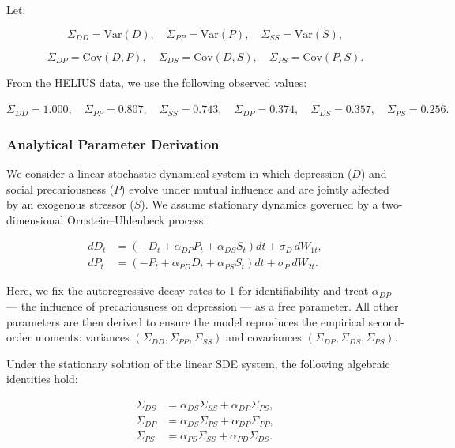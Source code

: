 \documentclass[
]{article}
\begin{document}
Let:

\[
\Sigma_{DD} = \mathrm{Var}(D), \quad \Sigma_{PP} = \mathrm{Var}(P), \quad \Sigma_{SS} = \mathrm{Var}(S),
\]

\[
\Sigma_{DP} = \mathrm{Cov}(D, P), \quad \Sigma_{DS} = \mathrm{Cov}(D, S), \quad \Sigma_{PS} = \mathrm{Cov}(P, S).
\]

From the HELIUS data, we use the following observed values:

\(\Sigma_{DD} = 1.000, \quad \Sigma_{PP} = 0.807, \quad \Sigma_{SS} = 0.743, \quad \Sigma_{DP} = 0.374, \quad \Sigma_{DS} = 0.357, \quad \Sigma_{PS} = 0.256.\)

\subsubsection{Analytical Parameter
Derivation}\label{analytical-parameter-derivation}

We consider a linear stochastic dynamical system in which depression
(\(D\)) and social precariousness (\(P\)) evolve under mutual influence
and are jointly affected by an exogenous stressor (\(S\)). We assume
stationary dynamics governed by a two-dimensional Ornstein--Uhlenbeck
process:

\[
\begin{aligned}
dD_t &= \left(-D_t + \alpha_{DP} P_t + \alpha_{DS} S_t\right)dt + \sigma_D\, dW_{1t}, \\
dP_t &= \left(-P_t + \alpha_{PD} D_t + \alpha_{PS} S_t\right)dt + \sigma_P\, dW_{2t}.
\end{aligned}
\]

Here, we fix the autoregressive decay rates to 1 for identifiability and
treat \(\alpha_{DP}\) --- the influence of precariousness on depression
--- as a free parameter. All other parameters are then derived to ensure
the model reproduces the empirical second-order moments: variances
\((\Sigma_{DD}, \Sigma_{PP}, \Sigma_{SS})\) and covariances
\((\Sigma_{DP}, \Sigma_{DS}, \Sigma_{PS})\).

Under the stationary solution of the linear SDE system, the following
algebraic identities hold:

\[
\begin{aligned}
\Sigma_{DS} &= \alpha_{DS} \Sigma_{SS} + \alpha_{DP} \Sigma_{PS}, \\
\Sigma_{DP} &= \alpha_{DS} \Sigma_{PS} + \alpha_{DP} \Sigma_{PP}, \\
\Sigma_{PS} &= \alpha_{PS} \Sigma_{SS} + \alpha_{PD} \Sigma_{DS}.
\end{aligned}
\]
\end{document}

